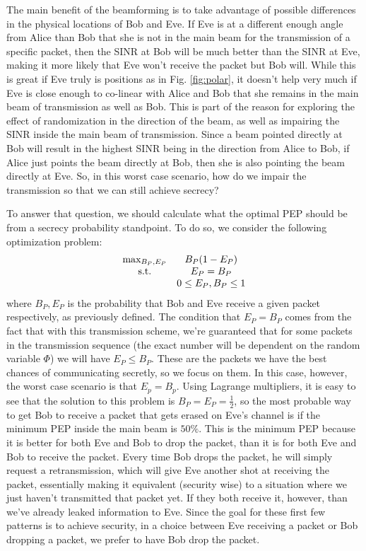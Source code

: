 \documentclass[letterpaper, 10 pt, conference]{ieeetran}  %
\theoremstyle{definition}
\theoremstyle{theorem}
\begin{document}
The main benefit of the beamforming is to take advantage of possible differences in the physical locations of Bob and Eve.  
If Eve is at a different enough angle from Alice than Bob that she is not in the main beam for the transmission of a specific packet, then the \ac{SINR} at Bob will be much better than the \ac{SINR} at Eve, making it more likely that Eve won't receive the packet but Bob will.  
While this is great if Eve truly is positions as in Fig. \ref{fig:polar}, it doesn't help very much if Eve is close enough to co-linear with Alice and Bob that she remains in the main beam of transmission as well as Bob.  
This is part of the reason for exploring the effect of randomization in the direction of the beam, as well as impairing the \ac{SINR} inside the main beam of transmission.  
Since a beam pointed directly at Bob will result in the highest \ac{SINR} being in the direction from Alice to Bob, if Alice just points the beam directly at Bob, then she is also pointing the beam directly at Eve.  
So, in this worst case scenario, how do we impair the transmission so that we can still achieve secrecy?  

To answer that question, we should calculate what the optimal \ac{PEP} should be from a secrecy probability standpoint.  
To do so, we consider the following optimization problem:
\[ \begin{matrix} \textnormal{max}_{B_P,E_P} & B_P(1-E_P) \\ \textnormal{s.t.} & E_P = B_P \\ & 0 \leq E_P,B_P \leq 1 \end{matrix} \]
where $B_P,E_P$ is the probability that Bob and Eve receive a given packet respectively, as previously defined.  
The condition that $E_P = B_P$ comes from the fact that with this transmission scheme, we're guaranteed that for some packets in the transmission sequence (the exact number will be dependent on the random variable $\Phi$) we will have $E_{P} \leq B_{P}$.  
These are the packets we have the best chances of communicating secretly, so we focus on them.  
In this case, however, the worst case scenario is that $E_{p} = B_{p}$.  
Using Lagrange multipliers, it is easy to see that the solution to this problem is $B_P = E_P = \frac{1}{2}$, so the most probable way to get Bob to receive a packet that gets erased on Eve's channel is if the minimum \ac{PEP} inside the main beam is $50\%$.  
This is the minimum \ac{PEP} because it is better for both Eve and Bob to drop the packet, than it is for both Eve and Bob to receive the packet.  
Every time Bob drops the packet, he will simply request a retransmission, which will give Eve another shot at receiving the packet, essentially making it equivalent (security wise) to a situation where we just haven't transmitted that packet yet.  
If they both receive it, however, than we've already leaked information to Eve.  
Since the goal for these first few patterns is to achieve security, in a choice between Eve receiving a packet or Bob dropping a packet, we prefer to have Bob drop the packet.
\end{document}
